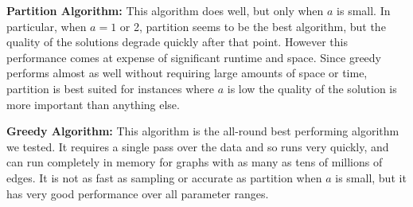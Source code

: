 \textbf{Partition Algorithm:} This algorithm does well, but only when $a$ is small.
In particular, when $a=1$ or 2, partition seems to be the best algorithm, but the quality
of the solutions degrade quickly after that point. However this performance comes at
expense of significant runtime and space. Since greedy performs almost as well without
requiring large amounts of space or time, partition is best suited for instances where
$a$ is low the quality of the solution is more important than anything else. \vs

\textbf{Greedy Algorithm:} This algorithm is the all-round best performing algorithm we tested.
It requires a single pass over the data and so runs very quickly, and can run completely in memory for graphs with as many as tens of millions of edges. It is not as fast as sampling or accurate as partition
when $a$ is small, but it has very good performance over all parameter ranges. 
